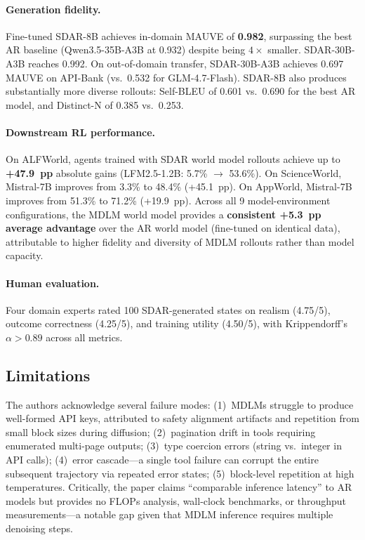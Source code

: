 \documentclass[11pt,a4paper]{article}
\begin{document}
\paragraph{Generation fidelity.}
Fine-tuned SDAR-8B achieves in-domain MAUVE of \textbf{0.982}, surpassing the best AR baseline (Qwen3.5-35B-A3B at 0.932) despite being $4\times$ smaller. SDAR-30B-A3B reaches 0.992. On out-of-domain transfer, SDAR-30B-A3B achieves 0.697 MAUVE on API-Bank (vs.\ 0.532 for GLM-4.7-Flash). SDAR-8B also produces substantially more diverse rollouts: Self-BLEU of 0.601 vs.\ 0.690 for the best AR model, and Distinct-N of 0.385 vs.\ 0.253.

\paragraph{Downstream RL performance.}
On ALFWorld, agents trained with SDAR world model rollouts achieve up to \textbf{+47.9~pp} absolute gains (LFM2.5-1.2B: 5.7\% $\to$ 53.6\%). On ScienceWorld, Mistral-7B improves from 3.3\% to 48.4\% (+45.1~pp). On AppWorld, Mistral-7B improves from 51.3\% to 71.2\% (+19.9~pp). Across all 9 model-environment configurations, the MDLM world model provides a \textbf{consistent +5.3~pp average advantage} over the AR world model (fine-tuned on identical data), attributable to higher fidelity and diversity of MDLM rollouts rather than model capacity.

\paragraph{Human evaluation.}
Four domain experts rated 100 SDAR-generated states on realism (4.75/5), outcome correctness (4.25/5), and training utility (4.50/5), with Krippendorff's $\alpha > 0.89$ across all metrics.

\subsection{Limitations}

The authors acknowledge several failure modes: (1)~MDLMs struggle to produce well-formed API keys, attributed to safety alignment artifacts and repetition from small block sizes during diffusion; (2)~pagination drift in tools requiring enumerated multi-page outputs; (3)~type coercion errors (string vs.\ integer in API calls); (4)~error cascade---a single tool failure can corrupt the entire subsequent trajectory via repeated error states; (5)~block-level repetition at high temperatures. Critically, the paper claims ``comparable inference latency'' to AR models but provides no FLOPs analysis, wall-clock benchmarks, or throughput measurements---a notable gap given that MDLM inference requires multiple denoising steps.
\end{document}
